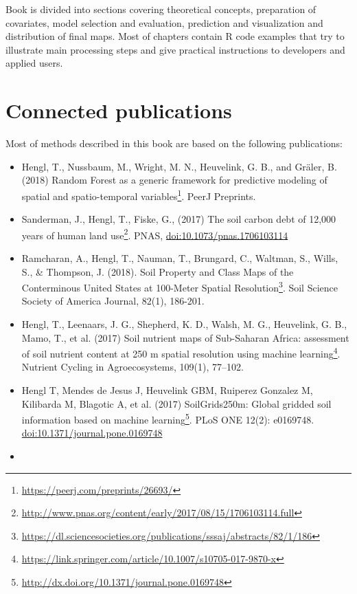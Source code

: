 \documentclass[11pt]{krantz}
\renewcommand{\href}[2]{#2\footnote{\url{#1}}}
\theoremstyle{definition}
\theoremstyle{definition}
\theoremstyle{definition}
\theoremstyle{remark}
\begin{document}
Book is divided into sections covering theoretical concepts, preparation
of covariates, model selection and evaluation, prediction and
visualization and distribution of final maps. Most of chapters contain R
code examples that try to illustrate main processing steps and give
practical instructions to developers and applied users.

\hypertarget{connected-publications}{%
\section*{Connected publications}\label{connected-publications}}


Most of methods described in this book are based on the following
publications:

\begin{itemize}
\item
  Hengl, T., Nussbaum, M., Wright, M. N., Heuvelink, G. B., and Gräler,
  B. (2018) \href{https://peerj.com/preprints/26693/}{Random Forest as a
  generic framework for predictive modeling of spatial and
  spatio-temporal variables}. PeerJ Preprints.
\item
  Sanderman, J., Hengl, T., Fiske, G., (2017)
  \href{http://www.pnas.org/content/early/2017/08/15/1706103114.full}{The
  soil carbon debt of 12,000 years of human land use}. PNAS,
  \url{doi:10.1073/pnas.1706103114}
\item
  Ramcharan, A., Hengl, T., Nauman, T., Brungard, C., Waltman, S.,
  Wills, S., \& Thompson, J. (2018).
  \href{https://dl.sciencesocieties.org/publications/sssaj/abstracts/82/1/186}{Soil
  Property and Class Maps of the Conterminous United States at 100-Meter
  Spatial Resolution}. Soil Science Society of America Journal, 82(1),
  186-201.
\item
  Hengl, T., Leenaars, J. G., Shepherd, K. D., Walsh, M. G., Heuvelink,
  G. B., Mamo, T., et al. (2017)
  \href{https://link.springer.com/article/10.1007/s10705-017-9870-x}{Soil
  nutrient maps of Sub-Saharan Africa: assessment of soil nutrient
  content at 250 m spatial resolution using machine learning}. Nutrient
  Cycling in Agroecosystems, 109(1), 77--102.
\item
  Hengl T, Mendes de Jesus J, Heuvelink GBM, Ruiperez Gonzalez M,
  Kilibarda M, Blagotic A, et al. (2017)
  \href{http://dx.doi.org/10.1371/journal.pone.0169748}{SoilGrids250m:
  Global gridded soil information based on machine learning}. PLoS ONE
  12(2): e0169748. \url{doi:10.1371/journal.pone.0169748}
\item

\end{itemize}
\end{document}
